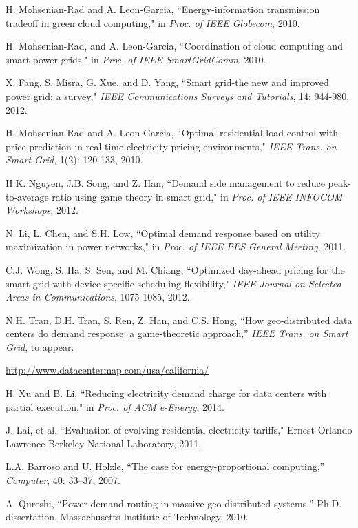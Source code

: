 \documentclass[journal]{IEEEtran}
\begin{document}
\begin{thebibliography}{1}
		H. Mohsenian-Rad and A. Leon-Garcia, ``Energy-information transmission tradeoff in green cloud computing,"  in {\it Proc. of IEEE Globecom}, 2010.
		
		H. Mohsenian-Rad, and A. Leon-Garcia, ``Coordination of cloud computing and smart power grids," in {\it Proc. of IEEE SmartGridComm}, 2010.
		
		X. Fang, S. Misra, G. Xue, and D. Yang, ``Smart grid-the new and improved power grid: a survey," {\it IEEE Communications Surveys and Tutorials}, 14: 944-980, 2012.
		
		H. Mohsenian-Rad and A. Leon-Garcia, ``Optimal residential load control with price prediction in real-time electricity pricing environments," {\it IEEE Trans. on Smart Grid}, 1(2): 120-133, 2010.
		
		H.K. Nguyen, J.B. Song, and Z. Han, ``Demand side management to reduce peak-to-average ratio using game theory in smart grid," in {\it Proc. of IEEE INFOCOM Workshops}, 2012.
		
		N. Li, L. Chen, and S.H. Low, ``Optimal demand response based on utility maximization in power networks," in {\it Proc. of IEEE PES General Meeting}, 2011.
		
		C.J. Wong, S. Ha, S. Sen, and M. Chiang, ``Optimized day-ahead pricing for the smart grid with device-specific scheduling flexibility," {\it IEEE Journal on Selected Areas in Communications}, 1075-1085, 2012.
		
		N.H. Tran, D.H. Tran, S. Ren, Z. Han, and C.S. Hong, ``How geo-distributed data centers do demand response: a game-theoretic approach,'' {\it IEEE Trans. on Smart Grid}, to appear.
		
		\url{http://www.datacentermap.com/usa/california/}
		
		H. Xu and B. Li, ``Reducing electricity demand charge for data centers with partial execution," in {\it Proc. of ACM e-Energy}, 2014.
		
		J. Lai, et al, ``Evaluation of evolving residential electricity tariffs," Ernest Orlando Lawrence Berkeley National Laboratory, 2011.
		
		L.A. Barroso and U. Holzle, ``The case for energy-proportional computing,'' {\it Computer}, 40: 33–37, 2007.
				
		A. Qureshi, ``Power-demand routing in massive geo-distributed systems,'' Ph.D. dissertation, Massachusetts Institute of Technology, 2010.		
					

\end{thebibliography}
\end{document}
